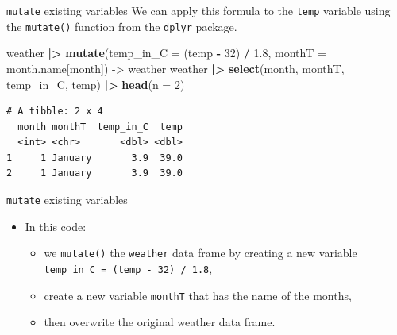 \documentclass[
  ignorenonframetext,
]{beamer}
\newenvironment{Shaded}{\begin{snugshade}}{\end{snugshade}}
\newcommand{\AttributeTok}[1]{\textcolor[rgb]{0.13,0.29,0.53}{#1}}
\newcommand{\DecValTok}[1]{\textcolor[rgb]{0.00,0.00,0.81}{#1}}
\newcommand{\FloatTok}[1]{\textcolor[rgb]{0.00,0.00,0.81}{#1}}
\newcommand{\FunctionTok}[1]{\textcolor[rgb]{0.13,0.29,0.53}{\textbf{#1}}}
\newcommand{\NormalTok}[1]{#1}
\newcommand{\OtherTok}[1]{\textcolor[rgb]{0.56,0.35,0.01}{#1}}
\newcommand{\SpecialCharTok}[1]{\textcolor[rgb]{0.81,0.36,0.00}{\textbf{#1}}}
\providecommand{\tightlist}{%
  \setlength{\itemsep}{0pt}\setlength{\parskip}{0pt}}
\begin{document}
\begin{frame}[fragile]{\texttt{mutate} existing variables}
\protect\hypertarget{mutate-existing-variables-1}{}
We can apply this formula to the \texttt{temp} variable using the
\texttt{mutate()} function from the \texttt{dplyr} package.

\normalsize

\begin{Shaded}
\begin{Highlighting}[]
\NormalTok{weather }\SpecialCharTok{|\textgreater{}} 
  \FunctionTok{mutate}\NormalTok{(}\AttributeTok{temp\_in\_C =}\NormalTok{ (temp }\SpecialCharTok{{-}} \DecValTok{32}\NormalTok{) }\SpecialCharTok{/} \FloatTok{1.8}\NormalTok{,}
         \AttributeTok{monthT =}\NormalTok{ month.name[month]) }\OtherTok{{-}\textgreater{}}\NormalTok{ weather}
\NormalTok{weather }\SpecialCharTok{|\textgreater{}} \FunctionTok{select}\NormalTok{(month, monthT, temp\_in\_C, temp) }\SpecialCharTok{|\textgreater{}} 
  \FunctionTok{head}\NormalTok{(}\AttributeTok{n =} \DecValTok{2}\NormalTok{)}
\end{Highlighting}
\end{Shaded}

\begin{verbatim}
# A tibble: 2 x 4
  month monthT  temp_in_C  temp
  <int> <chr>       <dbl> <dbl>
1     1 January       3.9  39.0
2     1 January       3.9  39.0
\end{verbatim}

\normalsize
\end{frame}

\begin{frame}[fragile]{\texttt{mutate} existing variables}
\protect\hypertarget{mutate-existing-variables-2}{}
\begin{itemize}
\item
  In this code:

  \begin{itemize}
  \tightlist
  \item
    we \texttt{mutate()} the \texttt{weather} data frame by creating a
    new variable \texttt{temp\_in\_C\ =\ (temp\ -\ 32)\ /\ 1.8},
  \item
    create a new variable \texttt{monthT} that has the name of the
    months,
  \item
    then overwrite the original weather data frame.
  \end{itemize}
\end{itemize}
\end{frame}
\end{document}
